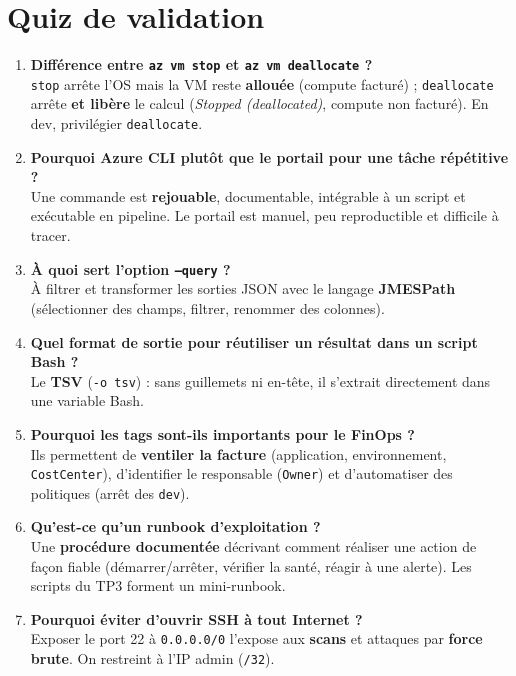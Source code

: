 \documentclass[11pt,a4paper]{article}
\newcommand{\code}[1]{\texttt{#1}}
\begin{document}
\section{Quiz de validation}

\begin{enumerate}[leftmargin=2.2em]
\item \textbf{Différence entre \code{az vm stop} et \code{az vm deallocate} ?}\\ \code{stop} arrête l'OS mais la VM reste \textbf{allouée} (compute facturé) ; \code{deallocate} arrête \textbf{et libère} le calcul (\textit{Stopped (deallocated)}, compute non facturé). En dev, privilégier \code{deallocate}.
\item \textbf{Pourquoi Azure CLI plutôt que le portail pour une tâche répétitive ?}\\ Une commande est \textbf{rejouable}, documentable, intégrable à un script et exécutable en pipeline. Le portail est manuel, peu reproductible et difficile à tracer.
\item \textbf{À quoi sert l'option \code{--query} ?}\\ À filtrer et transformer les sorties JSON avec le langage \textbf{JMESPath} (sélectionner des champs, filtrer, renommer des colonnes).
\item \textbf{Quel format de sortie pour réutiliser un résultat dans un script Bash ?}\\ Le \textbf{TSV} (\code{-o tsv}) : sans guillemets ni en-tête, il s'extrait directement dans une variable Bash.
\item \textbf{Pourquoi les tags sont-ils importants pour le FinOps ?}\\ Ils permettent de \textbf{ventiler la facture} (application, environnement, \code{CostCenter}), d'identifier le responsable (\code{Owner}) et d'automatiser des politiques (arrêt des \code{dev}).
\item \textbf{Qu'est-ce qu'un runbook d'exploitation ?}\\ Une \textbf{procédure documentée} décrivant comment réaliser une action de façon fiable (démarrer/arrêter, vérifier la santé, réagir à une alerte). Les scripts du TP3 forment un mini-runbook.
\item \textbf{Pourquoi éviter d'ouvrir SSH à tout Internet ?}\\ Exposer le port 22 à \code{0.0.0.0/0} l'expose aux \textbf{scans} et attaques par \textbf{force brute}. On restreint à l'IP admin (\code{/32}).

\end{enumerate}
\end{document}
